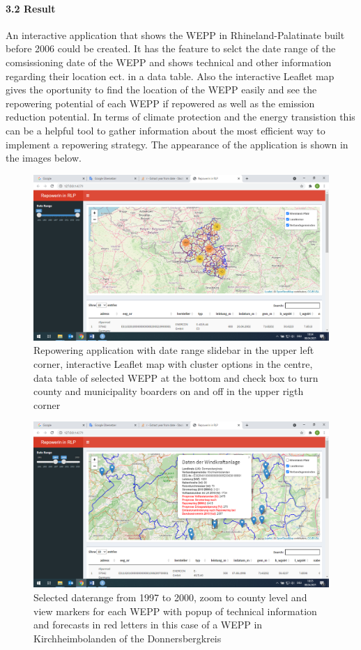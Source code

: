 \documentclass[
]{article}
\begin{document}
\hypertarget{result}{%
\paragraph{3.2 Result}\label{result}}

An interactive application that shows the WEPP in Rhineland-Palatinate
built before 2006 could be created. It has the feature to selct the date
range of the comsissioning date of the WEPP and shows technical and
other information regarding their location ect. in a data table. Also
the interactive Leaflet map gives the oportunity to find the location of
the WEPP easily and see the repowering potential of each WEPP if
repowered as well as the emission reduction potential. In terms of
climate protection and the energy transistion this can be a helpful tool
to gather information about the most efficient way to implement a
repowering strategy. The appearance of the application is shown in the
images below.

\begin{figure}
\centering
\includegraphics{images/repowering_image1.png}
\caption{Repowering application with date range slidebar in the upper
left corner, interactive Leaflet map with cluster options in the centre,
data table of selected WEPP at the bottom and check box to turn county
and municipality boarders on and off in the upper rigth corner}
\end{figure}

\begin{figure}
\centering
\includegraphics{images/repowering_image2.png}
\caption{Selected daterange from 1997 to 2000, zoom to county level and
view markers for each WEPP with popup of technical information and
forecasts in red letters in this case of a WEPP in Kirchheimbolanden of
the Donnersbergkreis}
\end{figure}
\end{document}
